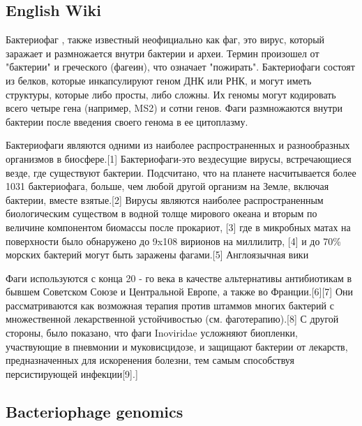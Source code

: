 \documentclass[14pt]{extarticle}
\begin{document}
    \begin{center}
    \item \subsection{English Wiki}
    \end{center}

	\par{Бактериофаг , также известный неофициально как фаг, это вирус, который
	заражает и размножается внутри бактерии и археи. Термин произошел от "бактерии" и греческого (фагеин), что
	означает "пожирать". Бактериофаги состоят из белков, которые инкапсулируют геном ДНК или РНК, и могут иметь
	структуры, которые либо просты, либо сложны. Их геномы могут кодировать всего четыре гена (например, MS2) и сотни
	генов. Фаги размножаются внутри бактерии после введения своего генома в ее цитоплазму.}
	
	\par{Бактериофаги являются одними из наиболее распространенных и разнообразных организмов в биосфере.[1]
	Бактериофаги-это вездесущие вирусы, встречающиеся везде, где существуют бактерии. Подсчитано, что на планете
	насчитывается более 1031 бактериофага, больше, чем любой другой организм на Земле, включая бактерии, вместе
	взятые.[2] Вирусы являются наиболее распространенным биологическим существом в водной толще мирового океана и вторым
	по величине компонентом биомассы после прокариот, [3] где в микробных матах на поверхности было обнаружено до 9x108
	вирионов на миллилитр, [4] и до 70\% морских бактерий могут быть заражены фагами.[5] Англоязычная вики}

    \par{Фаги используются с конца 20 - го века в качестве альтернативы антибиотикам в бывшем Советском Союзе и
    Центральной Европе, а также во Франции.[6][7] Они рассматриваются как возможная терапия против штаммов многих
    бактерий с множественной лекарственной устойчивостью (см. фаготерапию).[8] С другой стороны, было показано, что фаги
    Inoviridae усложняют биопленки, участвующие в пневмонии и муковисцидозе, и защищают бактерии от лекарств,
    предназначенных для искоренения болезни, тем самым способствуя персистирующей инфекции[9].]}
    
\begin{center}
   \item \subsection{Bacteriophage genomics \cite{genomics}}
\end{center}
\end{document}
